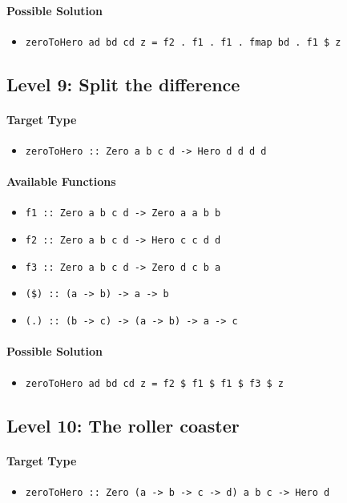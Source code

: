 \documentclass[preprint,12pt]{elsarticle}
\begin{document}
\paragraph{Possible Solution} 
\begin{itemize}
    \item \texttt{zeroToHero ad bd cd z = f2  . f1  . f1  . fmap bd  . f1 \$ z}
\end{itemize}

\subsection{Level 9: Split the difference}
\paragraph{Target Type } 
\begin{itemize}
    \item \texttt{zeroToHero :: Zero a b c d ->  Hero d d d d}
\end{itemize}

\paragraph{Available Functions} 
\begin{itemize}
    \item \texttt{f1 :: Zero a b c d -> Zero a a b b}
    \item \texttt{f2 :: Zero a b c d -> Hero c c d d}
    \item \texttt{f3 :: Zero a b c d -> Zero d c b a}
    \item \texttt{(\$) :: (a -> b) -> a -> b}
    \item \texttt{(.) :: (b -> c) -> (a -> b) -> a -> c}
\end{itemize}

\paragraph{Possible Solution} 
\begin{itemize}
    \item \texttt{zeroToHero ad bd cd z = f2 \$ f1 \$ f1 \$ f3 \$ z}
\end{itemize}


\subsection{Level 10: The roller coaster}
\paragraph{Target Type } 
\begin{itemize}
    \item \texttt{zeroToHero :: Zero (a -> b -> c -> d) a b c  -> Hero d}
\end{itemize}
\end{document}
